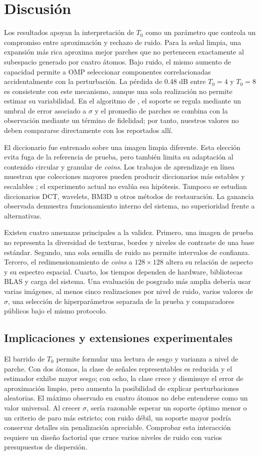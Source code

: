 \documentclass[conference]{IEEEtran}
\begin{document}
\section{Discusión}
Los resultados apoyan la interpretación de $T_0$ como un parámetro que controla un compromiso entre aproximación y rechazo de ruido. Para la señal limpia, una expansión más rica aproxima mejor parches que no pertenecen exactamente al subespacio generado por cuatro átomos. Bajo ruido, el mismo aumento de capacidad permite a OMP seleccionar componentes correlacionadas accidentalmente con la perturbación. La pérdida de 0.48 dB entre $T_0=4$ y $T_0=8$ es consistente con este mecanismo, aunque una sola realización no permite estimar su variabilidad. En el algoritmo de \cite{elad}, el soporte se regula mediante un umbral de error asociado a $\sigma$ y el promedio de parches se combina con la observación mediante un término de fidelidad; por tanto, nuestros valores no deben compararse directamente con los reportados allí.

El diccionario fue entrenado sobre una imagen limpia diferente. Esta elección evita fuga de la referencia de prueba, pero también limita su adaptación al contenido circular y granular de \emph{coins}. Los trabajos de aprendizaje en línea muestran que colecciones mayores pueden producir diccionarios más estables y escalables \cite{mairal}; el experimento actual no evalúa esa hipótesis. Tampoco se estudian diccionarios DCT, wavelets, BM3D u otros métodos de restauración. La ganancia observada demuestra funcionamiento interno del sistema, no superioridad frente a alternativas.

Existen cuatro amenazas principales a la validez. Primero, una imagen de prueba no representa la diversidad de texturas, bordes y niveles de contraste de una base estándar. Segundo, una sola semilla de ruido no permite intervalos de confianza. Tercero, el redimensionamiento de \emph{coins} a $128\times128$ altera su relación de aspecto y su espectro espacial. Cuarto, los tiempos dependen de hardware, bibliotecas BLAS y carga del sistema. Una evaluación de posgrado más amplia debería usar varias imágenes, al menos cinco realizaciones por nivel de ruido, varios valores de $\sigma$, una selección de hiperparámetros separada de la prueba y comparadores públicos bajo el mismo protocolo.

\subsection{Implicaciones y extensiones experimentales}
El barrido de $T_0$ permite formular una lectura de sesgo y varianza a nivel de parche. Con dos átomos, la clase de señales representables es reducida y el estimador exhibe mayor sesgo; con ocho, la clase crece y disminuye el error de aproximación limpio, pero aumenta la posibilidad de explicar perturbaciones aleatorias. El máximo observado en cuatro átomos no debe entenderse como un valor universal. Al crecer $\sigma$, sería razonable esperar un soporte óptimo menor o un criterio de paro más estricto; con ruido débil, un soporte mayor podría conservar detalles sin penalización apreciable. Comprobar esta interacción requiere un diseño factorial que cruce varios niveles de ruido con varios presupuestos de dispersión.
\end{document}
